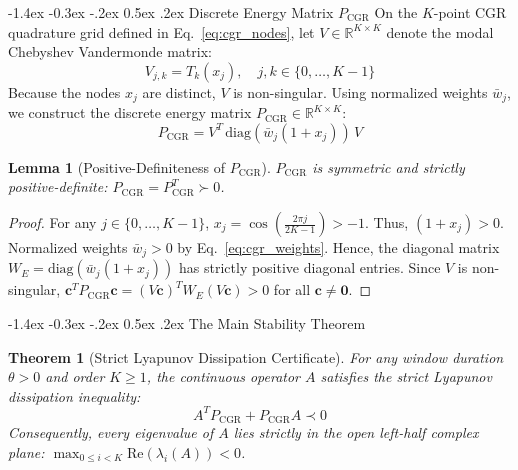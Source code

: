 \documentclass[10pt,twocolumn,a4paper]{article}
\makeatletter
\renewcommand\subsection{\@startsection{subsection}{2}{\z@}%
  {-1.4ex \@plus -0.3ex \@minus -.2ex}%
  {0.5ex \@plus .2ex}%
  {\normalfont\normalsize\bfseries}}
\theoremstyle{plain}
\newtheorem{theorem}{Theorem}
\newtheorem{lemma}{Lemma}
\theoremstyle{definition}
\makeatother
\begin{document}
\subsection{Discrete Energy Matrix $P_{\mathrm{CGR}}$}
On the $K$-point CGR quadrature grid defined in Eq.~\eqref{eq:cgr_nodes}, let $V \in \mathbb{R}^{K \times K}$ denote the modal Chebyshev Vandermonde matrix:
\begin{equation}
V_{j, k} = T_k(x_j), \quad j, k \in \{0, \dots, K-1\}
\end{equation}
Because the nodes $x_j$ are distinct, $V$ is non-singular. Using normalized weights $\bar{w}_j$, we construct the discrete energy matrix $P_{\mathrm{CGR}} \in \mathbb{R}^{K \times K}$:
\begin{equation}
P_{\mathrm{CGR}} = V^T \, \mathrm{diag}\!\left( \bar{w}_j (1 + x_j) \right) \, V
\label{eq:P_matrix}
\end{equation}

\begin{lemma}[Positive-Definiteness of $P_{\mathrm{CGR}}$]
$P_{\mathrm{CGR}}$ is symmetric and strictly positive-definite: $P_{\mathrm{CGR}} = P_{\mathrm{CGR}}^T \succ 0$.
\end{lemma}
\begin{proof}
For any $j \in \{0, \dots, K-1\}$, $x_j = \cos(\frac{2\pi j}{2K-1}) > -1$. Thus, $(1 + x_j) > 0$. Normalized weights $\bar{w}_j > 0$ by Eq.~\eqref{eq:cgr_weights}. Hence, the diagonal matrix $W_E = \mathrm{diag}(\bar{w}_j (1 + x_j))$ has strictly positive diagonal entries. Since $V$ is non-singular, $\mathbf{c}^T P_{\mathrm{CGR}} \mathbf{c} = (V \mathbf{c})^T W_E (V \mathbf{c}) > 0$ for all $\mathbf{c} \ne \mathbf{0}$.
\end{proof}

\subsection{The Main Stability Theorem}

\begin{theorem}[Strict Lyapunov Dissipation Certificate]
For any window duration $\theta > 0$ and order $K \ge 1$, the continuous operator $A$ satisfies the strict Lyapunov dissipation inequality:
\begin{equation}
A^T P_{\mathrm{CGR}} + P_{\mathrm{CGR}} A \prec 0
\label{eq:lyapunov_strict}
\end{equation}
Consequently, every eigenvalue of $A$ lies strictly in the open left-half complex plane: $\max_{0 \le i < K} \mathrm{Re}(\lambda_i(A)) < 0$.
\end{theorem}
\end{document}
